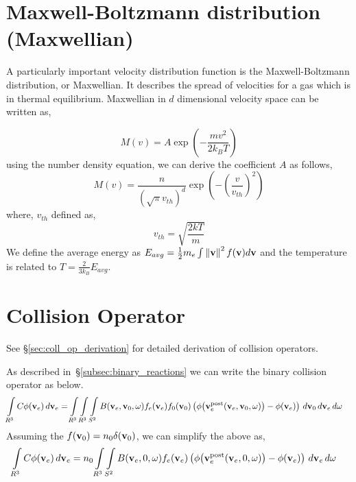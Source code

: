\documentclass{article}[draft]
\begin{document}
\section{Maxwell-Boltzmann distribution (Maxwellian)}
\label{sec:maxwellian}
A particularly important velocity distribution function is the Maxwell-Boltzmann distribution, or Maxwellian. It describes the spread of velocities for a gas which is in thermal equilibrium. Maxwellian in $d$ dimensional velocity space can be written as,

\begin{equation}
    M(v) = A \exp(-\frac{mv^2}{2k_BT})
\end{equation}
using the number density equation, we can derive the coefficient $A$ as follows, 
\begin{equation}
M(v) = \frac{n}{(\sqrt{\pi}v_{th})^d} \exp{\left(-\left(\frac{v}{v_{th}}\right)^2 \right)}    
\end{equation} where, $v_{th}$ defined as, 
\begin{equation}
    v_{th} = \sqrt{\frac{2kT}{m}}
\end{equation}
We define the average energy as $E_{avg} = \frac{1}{2} m_e \int \left\lVert\mathbf{v}\right\rVert^2 f(\mathbf{v}) d\mathbf{v}$ and the temperature is related to $T = \frac{2}{3k_B} E_{avg}$. 



\section{Collision Operator}
\label{sec:collision_operator}
See \S\ref{sec:coll_op_derivation} for detailed derivation of collision operators. 

As described in~\S\ref{subsec:binary_reactions} we can write the binary collision operator as below.  
\begin{align*}
\myint_{R^3} C \phi\of{\vect{v}_e} \diff{\vect{v}_e} 
&=
\myint_{R^3} \myint_{R^3} \myint_{S^2} 
B\of{\vect{v}_e, \vect{v}_0, \vect{\omega}} 
f_e\of{\vect{v}_e} f_0\of{\vect{v}_0} 
\left(
\phi\of{\vect{v}_e^\text{post}\of{\vect{v}_e, \vect{v}_0, \vect{\omega}}} 
- \phi\of{\vect{v}_e} 
\right)
\diff{\vect{v}_0} \diff{\vect{v}_e} \diff{\vect{\omega}}
\end{align*}
Assuming the $f(\mathbf{v}_0)= n_0\delta(\mathbf{v}_0)$, we can simplify the above as, 
\begin{align*}
\myint_{R^3} C \phi\of{\vect{v}_e} \diff{\vect{v}_e} 
&=
n_0 \myint_{R^3} \myint_{S^2} 
B\of{\vect{v}_e, 0, \vect{\omega}} 
f_e\of{\vect{v}_e}
\left(
\phi\of{\vect{v}_e^\text{post}\of{\vect{v}_e, 0, \vect{\omega}}} 
- \phi\of{\vect{v}_e} 
\right)
\diff{\vect{v}_e} \diff{\vect{\omega}}
\end{align*}
\end{document}
